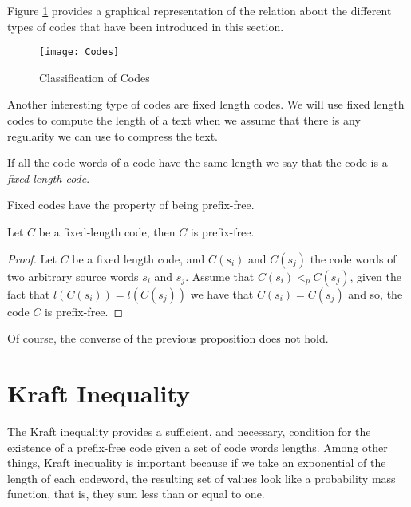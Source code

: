 Figure \ref{fig:Classification-Codes} provides a graphical representation of the relation about the different types of codes that have been introduced in this section.

\begin{figure}[h]
\centering\texttt{[image: Codes]}
\caption{\label{fig:Classification-Codes}Classification of Codes}
\end{figure}

Another interesting type of codes are fixed length codes. We will use fixed length codes to compute the length of a text when we assume that there is any regularity we can use to compress the text.

\begin{definition}
\label{def:Fixed-Length-Codes}
If all the code words of a code have the same length we say that the code is a \emph{fixed length code}.
\end{definition}

Fixed codes have the property of being prefix-free.

\begin{proposition}
Let $C$ be a fixed-length code, then $C$ is prefix-free.
\end{proposition}
\begin{proof}
Let $C$ be a fixed length code, and $C(s_i)$ and $C(s_j)$ the code words of two arbitrary source words $s_i$ and $s_j$. Assume that $C(s_i) <_p C(s_j)$, given the fact that $l(C(s_i)) = l(C(s_j))$ we have that $C(s_i) = C(s_j)$ and so, the code $C$ is prefix-free.
\end{proof}

Of course, the converse of the previous proposition does not hold.

%
%

\section{Kraft Inequality}

The Kraft inequality provides a sufficient, and necessary, condition for the existence of a prefix-free code given a set of code words lengths. Among other things, Kraft inequality is important because if we take an exponential of the length of each codeword, the resulting set of values look like a probability mass function, that is, they sum less than or equal to one.

